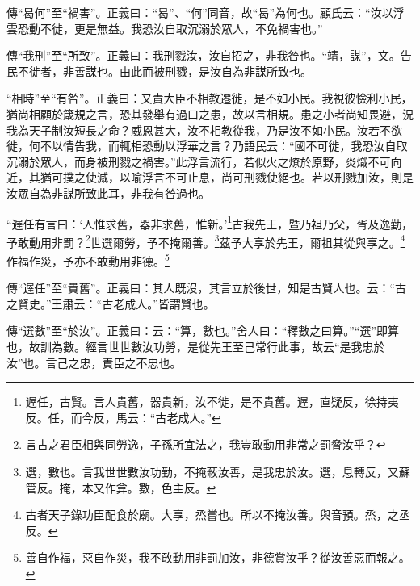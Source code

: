 {\noindent\zhuan{}\fzbyks 傳“曷何”至“禍害”。正義曰：“曷”、“何”同音，故“曷”為何也。顧氏云：“汝以浮雲恐動不徙，更是無益。我恐汝自取沉溺於眾人，不免禍害也。” \par}

{\noindent\zhuan{}\fzbyks 傳“我刑”至“所致”。正義曰：我刑戮汝，汝自招之，非我咎也。“靖，謀”，文。告民不徙者，非善謀也。由此而被刑戮，是汝自為非謀所致也。 \par}

{\noindent\shu{}\fzkt “相時”至“有咎”。正義曰：又責大臣不相教遷徙，是不如小民。我視彼憸利小民，猶尚相顧於箴規之言，恐其發舉有過口之患，故以言相規。患之小者尚知畏避，況我為天子制汝短長之命？威恩甚大，汝不相教從我，乃是汝不如小民。汝若不欲徙，何不以情告我，而輒相恐動以浮華之言？乃語民云：“國不可徙，我恐汝自取沉溺於眾人，而身被刑戮之禍害。”此浮言流行，若似火之燎於原野，炎熾不可向近，其猶可撲之使滅，以喻浮言不可止息，尚可刑戮使絕也。若以刑戮加汝，則是汝眾自為非謀所致此耳，非我有咎過也。 \par}

“遟任有言曰：‘人惟求舊，器非求舊，惟新。’\footnote{遟任，古賢。言人貴舊，器貴新，汝不徙，是不貴舊。遟，直疑反，徐持夷反。任，而今反，馬云：“古老成人。”}古我先王，暨乃祖乃父，胥及逸勤，予敢動用非罰？\footnote{言古之君臣相與同勞逸，子孫所宜法之，我豈敢動用非常之罰脅汝乎？}世選爾勞，予不掩爾善。\footnote{選，數也。言我世世數汝功勤，不掩蔽汝善，是我忠於汝。選，息轉反，又蘇管反。掩，本又作弇。數，色主反。}茲予大享於先王，爾祖其從與享之。\footnote{古者天子錄功臣配食於廟。大享，烝嘗也。所以不掩汝善。與音預。烝，之丞反。}作福作災，予亦不敢動用非德。\footnote{善自作福，惡自作災，我不敢動用非罰加汝，非德賞汝乎？從汝善惡而報之。}

{\noindent\zhuan{}\fzbyks 傳“遟任”至“貴舊”。正義曰：其人既沒，其言立於後世，知是古賢人也。云：“古之賢史。”王肅云：“古老成人。”皆謂賢也。 \par}

{\noindent\zhuan{}\fzbyks 傳“選數”至“於汝”。正義曰：云：“算，數也。”舍人曰：“釋數之曰算。”“選”即算也，故訓為數。經言世世數汝功勞，是從先王至己常行此事，故云“是我忠於汝”也。言己之忠，責臣之不忠也。 \par}

